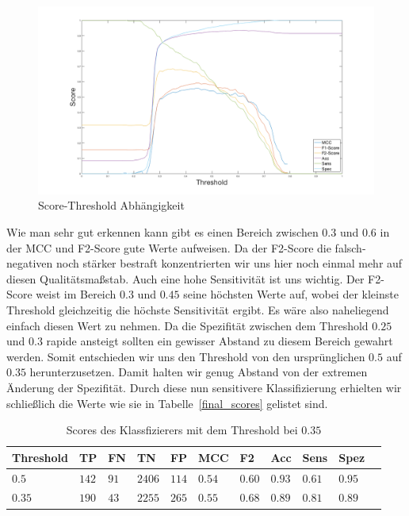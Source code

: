 \begin{figure}[htb!]
	\begin{center}
		\includegraphics[width=\textwidth]{./pics/evaluation/treshold.png}
		\caption{Score-Threshold Abhängigkeit}
		\label{fig:threshold}
    \end{center}
\end{figure}

Wie man sehr gut erkennen kann gibt es einen Bereich zwischen $0.3$ und $0.6$ in der MCC und F2-Score gute Werte aufweisen. Da der F2-Score die falsch-negativen noch stärker bestraft konzentrierten wir uns hier noch einmal mehr auf diesen Qualitätsmaßstab. Auch eine hohe Sensitivität ist uns wichtig. Der F2-Score weist im Bereich $0.3$ und $0.45$ seine höchsten Werte auf, wobei der kleinste Threshold gleichzeitig die höchste Sensitivität ergibt. Es wäre also naheliegend einfach diesen Wert zu nehmen. Da die Spezifität zwischen dem Threshold $0.25$ und $0.3$ rapide ansteigt sollten ein gewisser Abstand zu diesem Bereich gewahrt werden. Somit entschieden wir uns den Threshold von den ursprünglichen $0.5$ auf $0.35$ herunterzusetzen. Damit halten wir genug Abstand von der extremen Änderung der Spezifität. Durch diese nun sensitivere Klassifizierung erhielten wir schließlich die Werte wie sie in Tabelle~\ref{final_scores} gelistet sind.

\begin{table}[htb!]
\begin{center}
\begin{tabular}{lllllllllll}
	\toprule
 	Threshold  & TP & FN & TN & FP & MCC & F2 & Acc & Sens & Spez\\
	\midrule
    $0.5$ & $142$&	$91$ &	$2406$ &	$114$ &	$0.54$ 	&$0.60$	&$0.93$	&$0.61$&	$0.95$ \\
	$0.35$ & $190$ &	$43$ &	$2255$ &	$265$ &	$0.55$ &	$0.68$&	$0.89$ &	$0.81$ & $0.89$\\
 \bottomrule
 \end{tabular}
 \end{center}
  \caption{Scores des Klassfizierers mit dem Threshold bei $0.35$}
 \label{tab:final_scores}
 \end{table}













